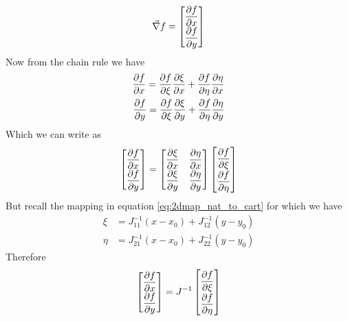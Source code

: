 \documentclass[11pt,letterpaper,titlepage]{article}
\numberwithin{equation}{section}
\begin{document}
\begin{align*}
\vec{\nabla}f = 
\renewcommand*{\arraystretch}{1.8}
\begin{bmatrix}
\dfrac{\partial f}{\partial x} \\
\dfrac{\partial f}{\partial y}
\end{bmatrix}
\end{align*}
Now from the chain rule we have
\begin{align*}
\renewcommand*{\arraystretch}{1.8}
\dfrac{\partial f}{\partial x} 
= \dfrac{\partial f}{\partial \xi}    \dfrac{\partial \xi}{\partial x}
+ \dfrac{\partial f}{\partial \eta}    \dfrac{\partial \eta}{\partial x} \\
\dfrac{\partial f}{\partial y} 
= \dfrac{\partial f}{\partial \xi}    \dfrac{\partial \xi}{\partial y}
+ \dfrac{\partial f}{\partial \eta}    \dfrac{\partial \eta}{\partial y}
\end{align*}
Which we can write as
\begin{align*}
\renewcommand*{\arraystretch}{1.8}
\begin{bmatrix}
\dfrac{\partial f}{\partial x} \\
\dfrac{\partial f}{\partial y}
\end{bmatrix}
=
\begin{bmatrix}
\dfrac{\partial \xi}{\partial x}     &\dfrac{\partial \eta}{\partial x} \\
 \dfrac{\partial \xi}{\partial y}    &\dfrac{\partial \eta}{\partial y}
\end{bmatrix}
\begin{bmatrix}
\dfrac{\partial f}{\partial \xi} \\
\dfrac{\partial f}{\partial \eta}
\end{bmatrix}
\end{align*}
But recall the mapping in equation \ref{eq:2dmap_nat_to_cart} for which we have
\begin{align*}
\xi &= J_{11}^{-1} (x-x_0)+J_{12}^{-1} (y-y_0) \\
\eta &= J_{21}^{-1} (x-x_0)+J_{22}^{-1} (y-y_0)
\end{align*}
Therefore
\begin{align*}
\renewcommand*{\arraystretch}{1.8}
\begin{bmatrix}
\dfrac{\partial f}{\partial x} \\
\dfrac{\partial f}{\partial y}
\end{bmatrix}
=
J^{-1}
\begin{bmatrix}
\dfrac{\partial f}{\partial \xi} \\
\dfrac{\partial f}{\partial \eta}
\end{bmatrix}
\end{align*}
\end{document}
